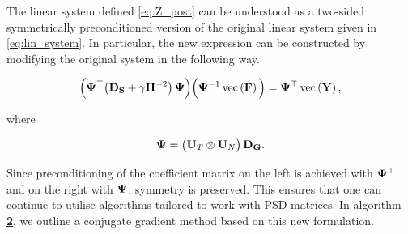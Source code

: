 The linear system defined \cref{eq:Z_post} can be understood as a two-sided symmetrically preconditioned version of the original linear system given in \cref{eq:lin_system}. In particular, the new expression can be constructed by modifying the original system in the following way.

\begin{equation}
    \Big(\mathbf{\Psi}^\top  \big(\mathbf{D}_{\mathbf{S}} + \gamma  \mathbf{H}^{-2}\big) \, \mathbf{\Psi}  \Big) \Big(\mathbf{\Psi}^{-1}\, \text{\textup{vec}}\left( \mathbf{F} \right) \Big) = \mathbf{\Psi}^\top \, \text{\textup{vec}}\left(\mathbf{Y}\right),
\end{equation}

\noindent where

\begin{equation}
    \mathbf{\Psi} =   \big(\mathbf{U}_T \otimes \mathbf{U}_N\big) \, \mathbf{D}_{\mathbf{G}}.
\end{equation}

Since preconditioning of the coefficient matrix on the left is achieved with $\mathbf{\Psi}^\top$ and on the right with $\mathbf{\Psi}$, symmetry is preserved. This ensures that one can continue to utilise algorithms tailored to work with PSD matrices. In algorithm \hyperlink{al:CGM}{\textbf{2}}, we outline a conjugate gradient method based on this new formulation. 

